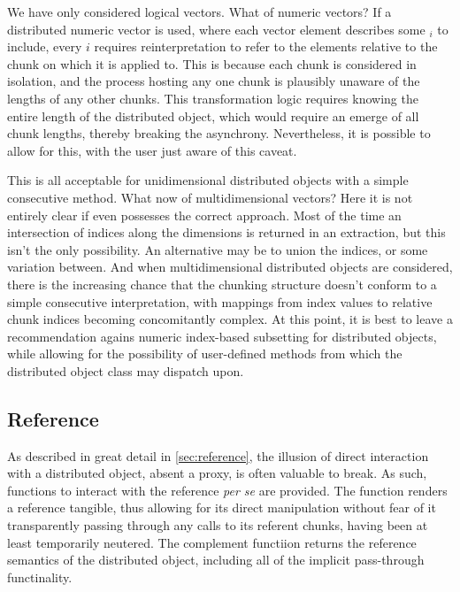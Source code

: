 We have only considered logical vectors.
What of numeric vectors?
If a distributed numeric vector is used, where each vector element describes some $_i$ to include, every $i$ requires reinterpretation to refer to the elements relative to the chunk on which it is applied to.
This is because each chunk is considered in isolation, and the process hosting any one chunk is plausibly unaware of the lengths of any other chunks.
This transformation logic requires knowing the entire length of the distributed object, which would require an emerge of all chunk lengths, thereby breaking the asynchrony.
Nevertheless, it is possible to allow for this, with the user just aware of this caveat.

This is all acceptable for unidimensional distributed objects with a simple consecutive  method.
What now of multidimensional vectors?
Here it is not entirely clear if \R{} even possesses the correct approach.
Most of the time an intersection of indices along the dimensions is returned in an extraction, but this isn't the only possibility.
An alternative may be to union the indices, or some variation between.
And when multidimensional distributed objects are considered, there is the increasing chance that the chunking structure doesn't conform to a simple consecutive interpretation, with mappings from index values to relative chunk indices becoming concomitantly complex.
At this point, it is best to leave a recommendation agains numeric index-based subsetting for distributed objects, while allowing for the possibility of user-defined methods from which the distributed object class may dispatch upon.

\subsection{Reference}

As described in great detail in \cref{sec:reference}, the illusion of direct interaction with a distributed object, absent a proxy, is often valuable to break.
As such, functions to interact with the reference \textit{per se} are provided.
The  function renders a reference tangible, thus allowing for its direct manipulation without fear of it transparently passing through any calls to its referent chunks, having been at least temporarily neutered.
The complement functiion  returns the reference semantics of the distributed object, including all of the implicit pass-through functinality.


